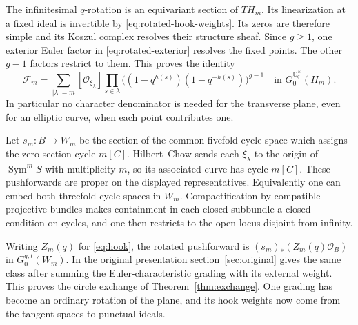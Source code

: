 The infinitesimal \(q\)-rotation is an equivariant section of \(T H_m\).
Its linearization at a fixed ideal is invertible by
\eqref{eq:rotated-hook-weights}. Its zeros are therefore simple and its
Koszul complex resolves their structure sheaf. Since \(g\ge1\), one
exterior Euler factor in \eqref{eq:rotated-exterior} resolves the fixed
points. The other \(g-1\) factors restrict to them. This proves the
identity
\begin{equation}
 \mathcal F_m
   =\sum_{|\lambda|=m}[\mathcal O_{\xi_\lambda}]
        \prod_{s\in\lambda}
            \big((1-q^{h(s)})(1-q^{-h(s)})\big)^{g-1}
 \quad\text{in }G_0^{\mathbb C^\times_q}(H_m).
 \label{eq:rotated-integral-concentration}
\end{equation}
In particular no character denominator is needed for the transverse
plane, even for an elliptic curve, when each point contributes one.

Let \(s_m:B\to W_m\) be the section of the common fivefold cycle space
which assigns the zero-section cycle \(m[C]\). Hilbert--Chow sends each
\(\xi_\lambda\) to the origin of \(\operatorname{Sym}^m S\) with
multiplicity \(m\), so its associated curve has cycle \(m[C]\).
These pushforwards are proper on the displayed representatives.
Equivalently one can embed both threefold cycle spaces in \(W_m\).
Compactification by compatible projective bundles makes containment
in each closed subbundle a closed condition on cycles, and one then
restricts to the open locus disjoint from infinity.

Writing \(Z_m(q)\) for \eqref{eq:hook}, the rotated pushforward is
\((s_m)_*(Z_m(q)\mathcal O_B)\) in \(G_0^{q,t}(W_m)\). In the original presentation
section~\ref{sec:original} gives the same class after summing the
Euler-characteristic grading with its external weight. This proves
the circle exchange of Theorem~\ref{thm:exchange}. One grading has
become an ordinary rotation of the plane, and its hook weights now
come from the tangent spaces to punctual ideals.

